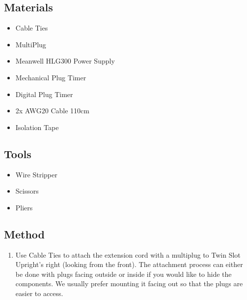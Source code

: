 \documentclass[letterpaper,10pt,english]{sphinxmanual}
\begin{document}
\subsection{Materials}
\label{\detokenize{wiring:materials}}\begin{itemize}
\item {} 
Cable Ties

\item {} 
Multi\sphinxhyphen{}Plug

\item {} 
Meanwell HLG300 Power Supply

\item {} 
Mechanical Plug Timer

\item {} 
Digital Plug Timer

\item {} 
2x AWG20 Cable 110cm

\item {} 
Isolation Tape

\end{itemize}


\subsection{Tools}
\label{\detokenize{wiring:tools}}\begin{itemize}
\item {} 
Wire Stripper

\item {} 
Scissors

\item {} 
Pliers

\end{itemize}


\subsection{Method}
\label{\detokenize{wiring:method}}
\noindent{}
\begin{enumerate}
%
\item {} 
Use Cable Ties to attach the extension cord with a multi\sphinxhyphen{}plug to Twin Slot Upright’s right (looking from the front). The attachment process can either be done with plugs facing outside or inside if you would like to hide the components. We usually prefer mounting it facing out so that the plugs are easier to access.

\end{enumerate}
\end{document}
